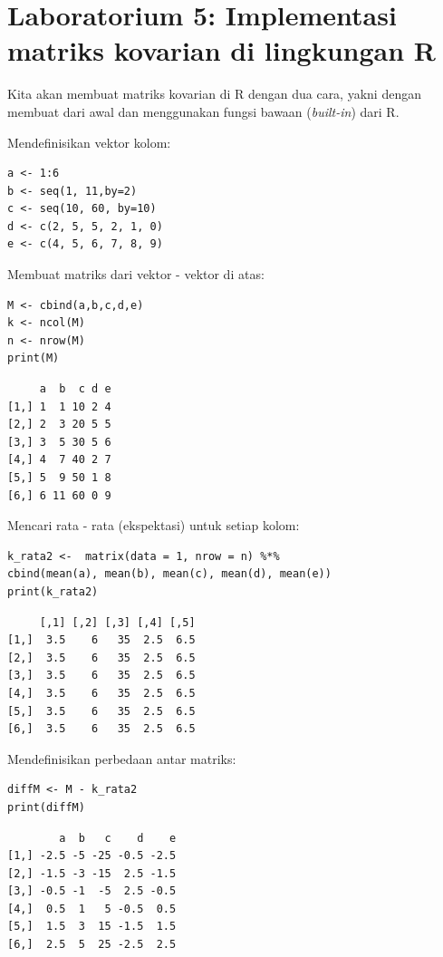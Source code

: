\section{Laboratorium 5: Implementasi matriks kovarian di lingkungan R}
Kita akan membuat matriks kovarian di R dengan dua cara, yakni dengan membuat dari awal dan menggunakan fungsi bawaan (\textit{built-in}) dari R.

Mendefinisikan vektor kolom:


\begin{verbatim}
a <- 1:6
b <- seq(1, 11,by=2)
c <- seq(10, 60, by=10)
d <- c(2, 5, 5, 2, 1, 0)
e <- c(4, 5, 6, 7, 8, 9)        
\end{verbatim}



Membuat matriks dari vektor - vektor di atas:

\begin{verbatim}
M <- cbind(a,b,c,d,e)
k <- ncol(M)
n <- nrow(M)
print(M)        
\end{verbatim}

\begin{verbatim}
     a  b  c d e
[1,] 1  1 10 2 4
[2,] 2  3 20 5 5
[3,] 3  5 30 5 6
[4,] 4  7 40 2 7
[5,] 5  9 50 1 8
[6,] 6 11 60 0 9        
\end{verbatim}

Mencari rata - rata (ekspektasi) untuk setiap kolom:

\begin{verbatim}
k_rata2 <-  matrix(data = 1, nrow = n) %*% 
cbind(mean(a), mean(b), mean(c), mean(d), mean(e))
print(k_rata2)    
\end{verbatim}

\begin{verbatim}
     [,1] [,2] [,3] [,4] [,5]
[1,]  3.5    6   35  2.5  6.5
[2,]  3.5    6   35  2.5  6.5
[3,]  3.5    6   35  2.5  6.5
[4,]  3.5    6   35  2.5  6.5
[5,]  3.5    6   35  2.5  6.5
[6,]  3.5    6   35  2.5  6.5
\end{verbatim}


Mendefinisikan perbedaan antar matriks:

\begin{verbatim}
diffM <- M - k_rata2
print(diffM)
\end{verbatim}

\begin{verbatim}
        a  b   c    d    e
[1,] -2.5 -5 -25 -0.5 -2.5
[2,] -1.5 -3 -15  2.5 -1.5
[3,] -0.5 -1  -5  2.5 -0.5
[4,]  0.5  1   5 -0.5  0.5
[5,]  1.5  3  15 -1.5  1.5
[6,]  2.5  5  25 -2.5  2.5
\end{verbatim}

